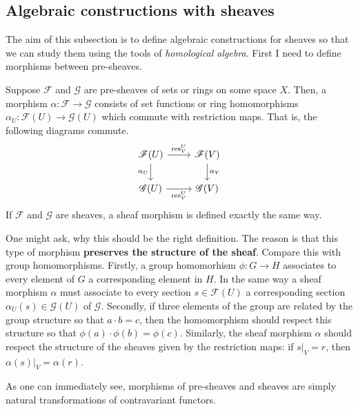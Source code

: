 \subsection{Algebraic constructions with sheaves}\label{ss:sheaf_alg}
The aim of this subsection is to define algebraic constructions for
sheaves so that we can study them using the tools of
\emph{homological algebra}. First I need to define morphisms between
pre-sheaves.
\begin{defin}
  Suppose $\mathscr{F}$ and $\mathscr{G}$ are pre-sheaves of sets or rings
  on some space $X$. Then, a morphism $\alpha:\mathscr{F}\to\mathscr{G}$
  consists of set functions or ring homomorphisms
  $\alpha_{U}:\mathscr{F}(U)\to\mathscr{G}(U)$ which commute with restriction
  maps. That is, the following diagrams commute.
  \[\begin{tikzcd}
      \mathscr{F}(U)\rar{\text{res}_{V}^{U}}\arrow[d, "\alpha_{U}"']
      & \mathscr{F}(V)\dar{\alpha_{V}} \\
      \mathscr{G}(U)\arrow[r,"\text{res}_{V}^{U}"'] & \mathscr{G}(V)
    \end{tikzcd}\]
  If $\mathscr{F}$ and $\mathscr{G}$ are sheaves, a sheaf morphism is defined
  exactly the same way.
\end{defin}
One might ask, why this should be the right definition. The reason is that
this type of morphism \textbf{preserves the structure of the sheaf}. Compare
this with group homomorphisms. Firstly, a group homomorhism $\phi:G\to H$
associates to every element of $G$ a corresponding element in $H$. In the
same way a sheaf morphism $\alpha$ must associate to every section
$s\in\mathscr{F}(U)$ a corresponding section $\alpha_{U}(s)\in\mathscr{G}(U)$
of $\mathscr{G}$. Secondly, if three elements of the group are related by
the group structure so that $a\cdot b = c$, then the homomorphism should
respect this structure so that $\phi(a)\cdot\phi(b)=\phi(c)$. Similarly,
the sheaf morphism $\alpha$ should respect the structure of the sheaves
given by the restriction maps: if $s\vert_{V}=r$, then $\alpha(s)\vert_{V}
=\alpha(r)$.
\begin{cat}
  As one can immediately see, morphisms of pre-sheaves and sheaves are simply
  natural transformations of contravariant functors.
\end{cat}

